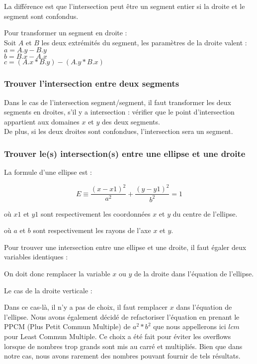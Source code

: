 \documentclass[]{article}
\begin{document}
La différence est que l'intersection peut être un segment entier si la droite
et le segment sont confondus.

Pour transformer un segment en droite : \\
Soit $A$ et $B$ les deux extrémités du segment, les paramètres de la droite valent : 
$ a = A.y - B.y $ \\
$ b = B.x - A.x $ \\
$ c = (A.x * B.y) - (A.y * B.x) $ \\

\subsubsection{Trouver l'intersection entre deux segments}

Dans le cas de l'intersection segment/segment, il faut transformer les
deux segments en droites, s'il y a intersection : vérifier que le point
d'intersection appartient aux domaines $x$ et $y$ des deux segments. \\
De plus, si les deux droites sont confondues, l'intersection sera un segment.

\subsubsection{Trouver le(s) intersection(s) entre une ellipse et une droite}

La formule d'une ellipse est : 

$$ E \equiv \frac{(x - x1)^2}{a^2} + \frac{(y - y1)^2}{b^2} = 1 $$

\begin{description}
\item où $x1$ et $y1$ sont respectivement les coordonnées
$x$ et $y$ du centre de l'ellipse. 
\item où $a$ et $b$ sont respectivement les rayons de l'axe
$x$ et $y$. \\
\end{description}

Pour trouver une intersection entre une ellipse
et une droite, il faut égaler deux variables 
identiques :

On doit donc remplacer la variable $x$ ou $y$ de la droite dans
l'équation de l'ellipse.

Le cas de la droite verticale : 

Dans ce cas-là, il n'y a pas de choix, il faut remplacer
$x$ dans l'équation de l'ellipse.
Nous avons également décidé de refactoriser l'équation en 
prenant le PPCM (Plus Petit Commun Multiple) de $a^2 * b^2$ que
nous appellerons ici $lcm$ pour Least Commun Multiple.
Ce choix a été fait pour éviter les overflows lorsque 
de nombres trop grands sont mis au carré et multipliés.
Bien que dans notre cas, nous avons rarement des nombres
pouvant fournir de tels résultats.
\end{document}
